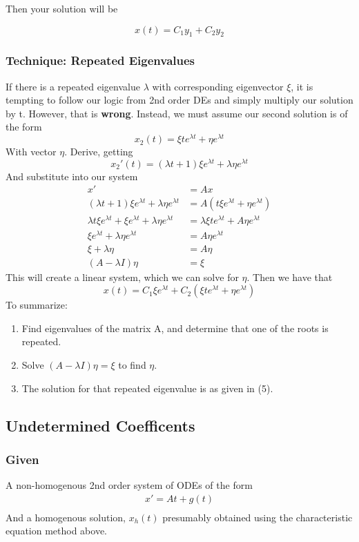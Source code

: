 \documentclass[11pt]{article}
\begin{document}
Then your solution will be

\[ x(t) = C_1y_1 + C_2y_2 \]

\subsubsection{Technique: Repeated Eigenvalues}
If there is a repeated eigenvalue $\lambda$ with corresponding eigenvector $\xi$, it is tempting to 
follow our logic from 2nd order DEs and simply multiply our solution by t. However, that is \textbf{wrong}.
Instead, we must assume our second solution is of the form 
\[ x_2(t) = \xi te^{\lambda t} + \eta e^{\lambda t} \]
With vector $\eta$. Derive, getting
\[ x_2'(t) = (\lambda t + 1)\xi e^{\lambda t} + \lambda \eta e^{\lambda t} \]
And substitute into our system
\begin{align*}
    x' &= Ax \\ 
    (\lambda t + 1)\xi e^{\lambda t} + \lambda \eta e^{\lambda t} &= A(t\xi e^{\lambda t} + \eta e^{\lambda t})  \\
    \lambda t \xi e^{\lambda t} + \xi e^{\lambda t} + \lambda \eta e^{\lambda t} &= \lambda \xi t e^{\lambda t} + A\eta e^{\lambda t} \\
     \xi e^{\lambda t} + \lambda \eta e^{\lambda t} &= A\eta e^{\lambda t} \\
     \xi  + \lambda \eta &= A\eta  \\
    (A - \lambda I)\eta &= \xi
\end{align*}
This will create a linear system, which we can solve for $\eta$. Then we have that
\begin{equation}
x(t) = C_1\xi e^{\lambda t} + C_2(\xi te^{\lambda t} + \eta e^{\lambda t}) 
\end{equation}
To summarize:
\begin{enumerate}
    \item Find eigenvalues of the matrix A, and determine that one of the roots is repeated.
    \item Solve $(A - \lambda I)\eta = \xi$ to find $\eta$.
    \item The solution for that repeated eigenvalue is as given in (5).
\end{enumerate}
\subsection{Undetermined Coefficents}
\subsubsection{Given}
A non-homogenous 2nd order system of ODEs of the form
\begin{align*}
    x' = At + g(t) \\
\end{align*}
And a homogenous solution, $x_h(t)$ presumably obtained using the characteristic equation method above.
\end{document}
